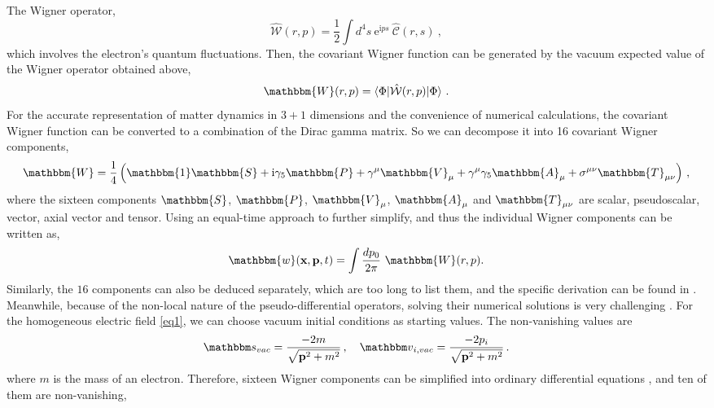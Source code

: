 \documentclass[aps,preprint,superscriptaddress]{revtex4}
\begin{document}
The Wigner operator,
\begin{equation}
\hat{\mathcal W} \left( r , p \right) = \frac{1}{2} \int d^4 s \
\mathrm{e}^{\mathrm{i} ps} \ \hat{\mathcal C} \left( r , s
\right)\ ,
\end{equation}
which involves the electron's quantum fluctuations.
Then, the covariant Wigner function can be generated by the vacuum expected value of the Wigner operator obtained above,
\begin{equation}
\mathbbm{W} ( r,p ) = \langle \Phi \vert \hat{\mathcal W} ( r,p ) \vert \Phi \rangle\ .
\end{equation}
For the accurate representation of matter dynamics in $3 + 1$ dimensions and the convenience of numerical calculations, the covariant Wigner function can be converted to a combination of the Dirac gamma matrix. So we can decompose it into 16 covariant Wigner components,
\begin{equation}
\mathbbm{W} = \frac{1}{4} \left( \mathbbm{1} \mathbbm{S} + \textrm{i} \gamma_5
\mathbbm{P} + \gamma^{\mu} \mathbbm{V}_{\mu} + \gamma^{\mu} \gamma_5
\mathbbm{A}_{\mu} + \sigma^{\mu \nu} \mathbbm{T}_{\mu \nu} \right) \, ,
\label{decomp}
\end{equation}
where the sixteen components $\mathbbm{S}$, $\mathbbm{P}$, $\mathbbm{V}_{\mu}$, $\mathbbm{A}_{\mu}$ and $\mathbbm{T}_{\mu \nu}$
are scalar, pseudoscalar, vector, axial vector and
tensor.
Using an equal-time approach \cite{Ochs:1998ap} to further simplify, and thus the individual Wigner components can be written as,
\begin{align}
\mathbbm{w} ( \textbf{x}, \textbf{p}, t ) = \int \frac{d p_0}{2 \pi}\ \mathbbm{W} ( r,p) .
\end{align}
Similarly, the $16$ components can also be deduced separately, which are too long to list them, and the specific derivation can be found in \cite{Heben:2010pd,Kohlf:11phd}. Meanwhile, because of the non-local nature of the pseudo-differential operators, solving their numerical solutions is very challenging \cite{Hebenstreit:2br,Kohlfurst:2015niu,Kohlf:11phd,Ber:2018pb}.
For the homogeneous electric field \eqref{eq1}, we can choose vacuum initial conditions as starting values. The non-vanishing values are
\begin{equation}
{\mathbbm s}_{vac} = \frac{-2m}{\sqrt{{\textbf p}^2+m^2}} \, ,
\quad {\mathbbm v}_{i,vac} = \frac{-2{ p_i} }{\sqrt{\textbf{p}^2+m^2}} \, .
\end{equation}
where $m$ is the mass of an electron. Therefore, sixteen Wigner components can be simplified into ordinary differential equations \cite{Blinne2}, and ten of them are non-vanishing,
\end{document}
